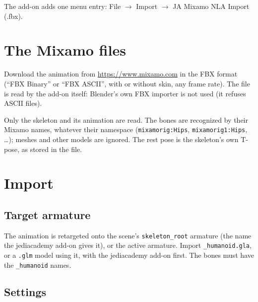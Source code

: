 \documentclass[a4paper,10pt]{article}
\begin{document}
 The add-on adds one menu entry: File $\rightarrow$ Import $\rightarrow$ JA Mixamo NLA Import (.fbx).

 \section{The Mixamo files}

 Download the animation from \url{https://www.mixamo.com} in the FBX format (``FBX Binary'' or
 ``FBX ASCII'', with or without skin, any frame rate). The file is read by the add-on itself:
 Blender's own FBX importer is not used (it refuses ASCII files).

 Only the skeleton and its animation are read. The bones are recognized by their Mixamo names,
 whatever their namespace (\texttt{mixamorig:Hips}, \texttt{mixamorig1:Hips}, \ldots); meshes and
 other models are ignored. The rest pose is the skeleton's own T-pose, as stored in the file.

 \section{Import}

 \subsection{Target armature}

 The animation is retargeted onto the scene's \texttt{skeleton\_root} armature (the name the
 jediacademy add-on gives it), or the active armature. Import \texttt{\_humanoid.gla}, or a
 \texttt{.glm} model using it, with the jediacademy add-on first. The bones must have the
 \texttt{\_humanoid} names.

 \subsection{Settings}
\end{document}
